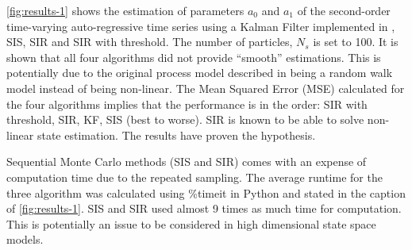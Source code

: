 \documentclass{article}
\begin{document}
\cref{fig:results-1} shows the estimation of parameters $a_0$ and $a_1$ of the second-order time-varying auto-regressive time series using a Kalman Filter implemented in \cite{lab2ans}, SIS, SIR and SIR with threshold. The number of particles, $N_s$ is set to 100. It is shown that all four algorithms did not provide ``smooth'' estimations. This is potentially due to the original process model described in \cite{lab2} being a random walk model instead of being non-linear. The Mean Squared Error (MSE) calculated for the four algorithms implies that the performance is in the order: SIR with threshold, SIR, KF, SIS (best to worse). SIR is known to be able to solve non-linear state estimation. The results have proven the hypothesis.

Sequential Monte Carlo methods (SIS and SIR) comes with an expense of computation time due to the repeated sampling. The average runtime for the three algorithm was calculated using \%timeit in Python and stated in the caption of \cref{fig:results-1}. SIS and SIR used almost 9 times as much time for computation. This is potentially an issue to be considered in high dimensional state space models.
\end{document}
